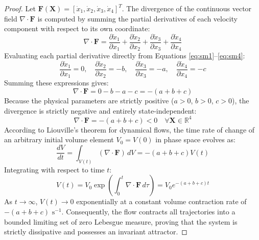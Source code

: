\documentclass[12pt,a4paper,oneside]{report}
\begin{document}
\begin{proof}
Let $\mathbf{F}(\mathbf{X}) = [\dot{x}_1, \dot{x}_2, \dot{x}_3, \dot{x}_4]^T$. The divergence of the continuous vector field $\nabla \cdot \mathbf{F}$ is computed by summing the partial derivatives of each velocity component with respect to its own coordinate:
\begin{equation}
    \nabla \cdot \mathbf{F} = \frac{\partial \dot{x}_1}{\partial x_1} + \frac{\partial \dot{x}_2}{\partial x_2} + \frac{\partial \dot{x}_3}{\partial x_3} + \frac{\partial \dot{x}_4}{\partial x_4}
\end{equation}
Evaluating each partial derivative directly from Equations \eqref{eq:sm1}--\eqref{eq:sm4}:
\begin{equation}
    \frac{\partial \dot{x}_1}{\partial x_1} = 0, \quad 
    \frac{\partial \dot{x}_2}{\partial x_2} = -b, \quad 
    \frac{\partial \dot{x}_3}{\partial x_3} = -a, \quad 
    \frac{\partial \dot{x}_4}{\partial x_4} = -c
\end{equation}
Summing these expressions gives:
\begin{equation}
    \nabla \cdot \mathbf{F} = 0 - b - a - c = -(a + b + c)
    \label{eq:divergence}
\end{equation}
Because the physical parameters are strictly positive ($a > 0$, $b > 0$, $c > 0$), the divergence is strictly negative and entirely state-independent:
\begin{equation}
    \nabla \cdot \mathbf{F} = -(a + b + c) < 0 \quad \forall \mathbf{X} \in \mathbb{R}^4
\end{equation}
According to Liouville's theorem for dynamical flows, the time rate of change of an arbitrary initial volume element $V_0 = V(0)$ in phase space evolves as:
\begin{equation}
    \frac{dV}{dt} = \int_{V(t)} (\nabla \cdot \mathbf{F}) \, dV = -(a + b + c) V(t)
\end{equation}
Integrating with respect to time $t$:
\begin{equation}
    V(t) = V_0 \exp\left( \int_0^t \nabla \cdot \mathbf{F} \, d\tau \right) = V_0 e^{-(a + b + c)t}
\end{equation}
As $t \to \infty$, $V(t) \to 0$ exponentially at a constant volume contraction rate of $-(a+b+c)\text{ s}^{-1}$. Consequently, the flow contracts all trajectories into a bounded limiting set of zero Lebesgue measure, proving that the system is strictly dissipative and possesses an invariant attractor.
\end{proof}
\end{document}

